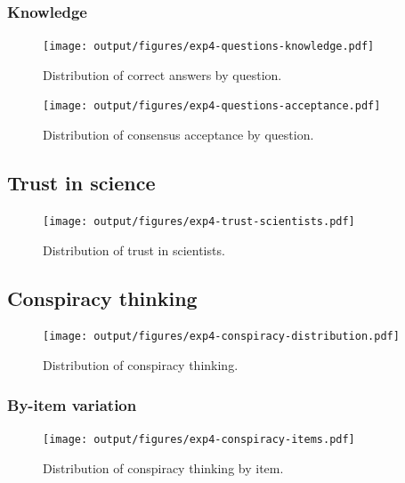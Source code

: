 \documentclass[
  doc,floatsintext]{apa6}
\begin{document}
\subsubsection{Knowledge}\label{knowledge-3}



\begin{figure}
\centering
\texttt{[image: output/figures/exp4-questions-knowledge.pdf]}
\caption{\label{fig:exp4-questions-knowledge}Distribution of correct answers by question.}
\end{figure}



\begin{figure}
\centering
\texttt{[image: output/figures/exp4-questions-acceptance.pdf]}
\caption{\label{fig:exp4-questions-acceptance}Distribution of consensus acceptance by question.}
\end{figure}

\subsection{Trust in science}\label{trust-in-science-9}



\begin{figure}
\centering
\texttt{[image: output/figures/exp4-trust-scientists.pdf]}
\caption{\label{fig:exp4-trust-scientists}Distribution of trust in scientists.}
\end{figure}

\subsection{Conspiracy thinking}\label{conspiracy-thinking-3}



\begin{figure}
\centering
\texttt{[image: output/figures/exp4-conspiracy-distribution.pdf]}
\caption{\label{fig:exp4-conspiracy-distribution}Distribution of conspiracy thinking.}
\end{figure}

\subsubsection{By-item variation}\label{by-item-variation-3}



\begin{figure}
\centering
\texttt{[image: output/figures/exp4-conspiracy-items.pdf]}
\caption{\label{fig:exp4-conspiracy-items}Distribution of conspiracy thinking by item.}
\end{figure}
\end{document}
